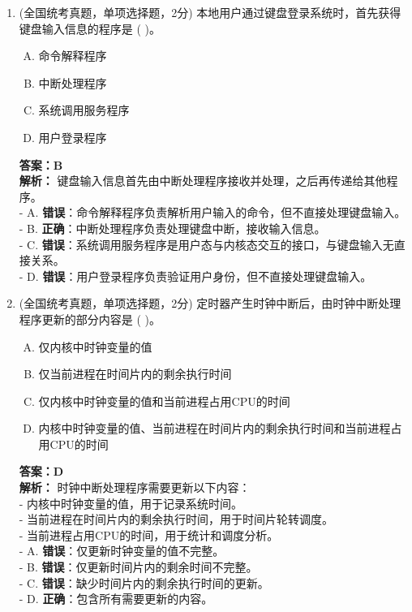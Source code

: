 \documentclass[lang=cn,newtx,10pt,scheme=chinese]{../../elegantbook}
\begin{document}
\begin{enumerate}
    \item (全国统考真题，单项选择题，2分) 本地用户通过键盘登录系统时，首先获得键盘输入信息的程序是 (    )。
    \begin{enumerate}[A.]
        \item 命令解释程序
        \item 中断处理程序
        \item 系统调用服务程序
        \item 用户登录程序
    \end{enumerate}
    \textbf{答案：B}\\
    \textbf{解析：} 键盘输入信息首先由中断处理程序接收并处理，之后再传递给其他程序。\\
    - A. \textbf{错误}：命令解释程序负责解析用户输入的命令，但不直接处理键盘输入。\\
    - B. \textbf{正确}：中断处理程序负责处理键盘中断，接收输入信息。\\
    - C. \textbf{错误}：系统调用服务程序是用户态与内核态交互的接口，与键盘输入无直接关系。\\
    - D. \textbf{错误}：用户登录程序负责验证用户身份，但不直接处理键盘输入。\\

\item (全国统考真题，单项选择题，2分) 定时器产生时钟中断后，由时钟中断处理程序更新的部分内容是 (    )。
    \begin{enumerate}[A.]
        \item 仅内核中时钟变量的值
        \item 仅当前进程在时间片内的剩余执行时间
        \item 仅内核中时钟变量的值和当前进程占用CPU的时间
        \item 内核中时钟变量的值、当前进程在时间片内的剩余执行时间和当前进程占用CPU的时间
    \end{enumerate}
    \textbf{答案：D}\\
    \textbf{解析：} 时钟中断处理程序需要更新以下内容：\\
    - 内核中时钟变量的值，用于记录系统时间。\\
    - 当前进程在时间片内的剩余执行时间，用于时间片轮转调度。\\
    - 当前进程占用CPU的时间，用于统计和调度分析。\\
    - A. \textbf{错误}：仅更新时钟变量的值不完整。\\
    - B. \textbf{错误}：仅更新时间片内的剩余时间不完整。\\
    - C. \textbf{错误}：缺少时间片内的剩余执行时间的更新。\\
    - D. \textbf{正确}：包含所有需要更新的内容。\\


\end{enumerate}
\end{document}

